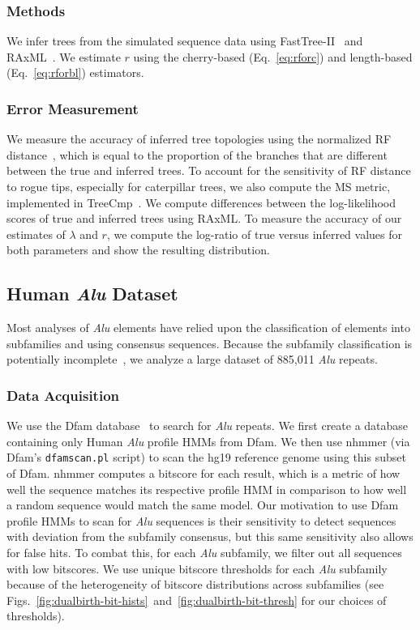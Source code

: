 \subsubsection{Methods}
We infer trees from the simulated sequence data using FastTree-II~\cite{Price2010} and RAxML~\cite{Stamatakis2014}. We estimate $r$ using the cherry-based (Eq.~\ref{eq:rforc}) and length-based (Eq.~\ref{eq:rforbl}) estimators.

\subsubsection{Error Measurement}
We measure the accuracy of inferred tree topologies using the normalized \gls{RF} distance~\cite{Robinson1981}, which is equal to the proportion of the branches that are different between the true and inferred trees. To account for the sensitivity of \gls{RF} distance to rogue tips, especially for caterpillar trees, we also compute the \gls{MS} metric, implemented in TreeCmp~\cite{Bogdanowicz2012}. We compute differences between the log-likelihood scores of true and inferred trees using RAxML. To measure the accuracy of our estimates of $\lambda$ and $r$, we compute the log-ratio of true versus inferred values for both parameters and show the resulting distribution.

\subsection{Human \textit{Alu} Dataset}
Most analyses of \textit{Alu} elements have relied upon the classification of elements into subfamilies and using consensus sequences. Because the subfamily classification is potentially incomplete~\cite{Price2004}, we analyze a large dataset of 885,011 \textit{Alu} repeats.

\subsubsection{Data Acquisition}\label{sec:aluseqs}
We use the Dfam database~\cite{Hubley2016} to search for \textit{Alu} repeats. We first create a database containing only Human \textit{Alu} profile \glspl{HMM} from Dfam. We then use nhmmer (via Dfam's \texttt{dfamscan.pl} script) to scan the hg19 reference genome using this subset of Dfam. nhmmer computes a bitscore for each result, which is a metric of how well the sequence matches its respective profile HMM in comparison to how well a random sequence would match the same model. Our motivation to use Dfam profile \glspl{HMM} to scan for \textit{Alu} sequences is their sensitivity to detect sequences with deviation from the subfamily consensus, but this same sensitivity also allows for false hits. To combat this, for each \textit{Alu} subfamily, we filter out all sequences with low bitscores. We use unique bitscore thresholds for each \textit{Alu} subfamily because of the heterogeneity of bitscore distributions across subfamilies (see Figs.~\ref{fig:dualbirth-bit-hists}~and~\ref{fig:dualbirth-bit-thresh} for our choices of thresholds).

